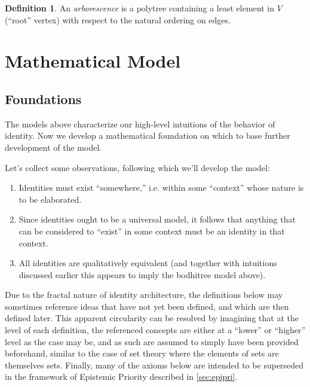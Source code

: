 \documentclass[pra,twocolumn,groupedaddress,10pt]{revtex4}
\theoremstyle{definition}
\newtheorem{defn}{Definition}[section]
\begin{document}
\begin{defn}
	An \emph{arborescence} is a polytree containing a least element in $V$ (``root'' vertex) with respect to the natural ordering on edges.
\end{defn}

\section{Mathematical Model} \label{sec:matmod}

\subsection{Foundations} \label{sec:foundations}

The models above characterize our high-level intuitions of the behavior of identity. Now we develop a mathematical foundation on which to base further development of the model.

Let's collect some observations, following which we'll develop the model:

\begin{enumerate}
	\item Identities must exist ``somewhere,'' i.e. within some ``context'' whose nature is to be elaborated.
	\item Since identities ought to be a universal model, it follows that anything that can be considered to ``exist'' in some context must be an identity in that context.
	\item All identities are qualitatively equivalent (and together with intuitions discussed earlier this appears to imply the bodhitree model above).
\end{enumerate}

Due to the fractal nature of identity architecture, the definitions below may sometimes reference ideas that have not yet been defined, and which are then defined later. This apparent circularity can be resolved by imagining that at the level of each definition, the referenced concepts are either at a ``lower'' or ``higher'' level as the case may be, and as such are assumed to simply have been provided beforehand, similar to the case of set theory where the elements of sets are themselves sets. Finally, many of the axioms below are intended to be superseded in the framework of Epistemic Priority described in \autoref{sec:epipri}.
\end{document}
